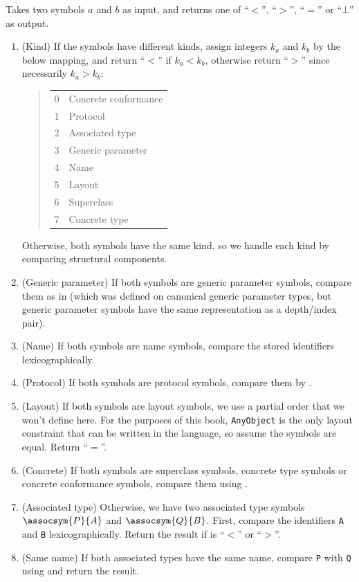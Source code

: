 \documentclass[../generics]{subfiles}
\begin{document}
\begin{algorithm}\label{symbol reduction order}
Takes two symbols $a$ and $b$ as input, and returns one of ``$<$'', ``$>$'', ``$=$'' or ``$\bot$'' as output.
\begin{enumerate}
\item (Kind) If the symbols have different kinds, assign integers $k_a$ and $k_b$ by the below mapping, and return ``$<$'' if $k_a<k_b$, otherwise return ``$>$'' since necessarily $k_a>k_b$:
\begin{quote}
\begin{tabular}{|l|l|}
\hline
0&Concrete conformance\\
1&Protocol\\
2&Associated type\\
3&Generic parameter\\
4&Name\\
5&Layout\\
6&Superclass\\
7&Concrete type\\
\hline
\end{tabular}
\end{quote}
Otherwise, both symbols have the same kind, so we handle each kind by comparing structural components.
%
\item (Generic parameter) If both symbols are generic parameter symbols, compare them as in  (which was defined on canonical generic parameter types, but generic parameter symbols have the same representation as a depth/index pair).
%
%
\item (Name) If both symbols are name symbols, compare the stored identifiers lexicographically.
%
\item (Protocol) If both symbols are protocol symbols, compare them by .
%
\item (Layout) If both symbols are layout symbols, we use a partial order that we won't define here. For the purposes of this book, \texttt{AnyObject} is the only layout constraint that can be written in the language, so assume the symbols are equal. Return ``$=$''.
\item (Concrete) If both symbols are superclass symbols, concrete type symbols or concrete conformance symbols, compare them using .
%
\item (Associated type) Otherwise, we have two associated type symbols $\assocsym{P}{A}$ and $\assocsym{Q}{B}$. First, compare the identifiers \texttt{A} and \texttt{B} lexicographically. Return the result if is ``$<$'' or ``$>$''.
\item (Same name) If both associated types have the same name, compare \texttt{P} with \texttt{Q} using  and return the result.
\end{enumerate}
\end{algorithm}
\end{document}
